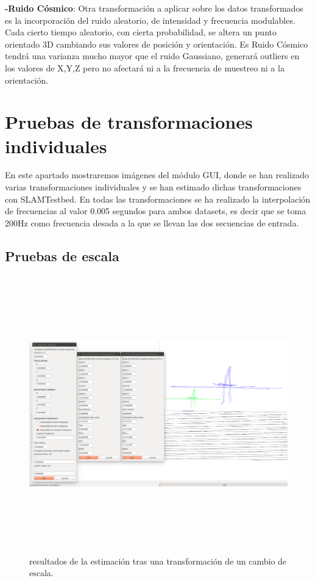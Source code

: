 \textbf{-Ruido Cósmico}: Otra transformación a aplicar sobre los datos transformados es la incorporación del ruido aleatorio, de intensidad y frecuencia modulables. Cada cierto tiempo aleatorio, con cierta probabilidad, se altera un punto orientado 3D cambiando sus valores de posición y orientación. Es Ruido Cósmico tendrá una varianza mucho mayor que el ruido Gaussiano, generará outliers en los valores de X,Y,Z pero no afectará ni a la frecuencia de muestreo ni a la orientación.


\section{Pruebas de transformaciones individuales}

En este apartado mostraremos imágenes del módulo GUI, donde se han realizado varias transformaciones individuales y se han estimado dichas transformaciones con SLAMTestbed.
En todas las transformaciones se ha realizado la interpolación de frecuencias al valor 0.005 segundos para ambos datasets, es decir que se toma 200Hz como frecuencia desada a la que se llevan las dos secuencias de entrada.

\subsection{Pruebas de escala}

\begin{figure}[h]
\label{fig:escalaTest}\includegraphics[height=12.0cm,width=18.0cm]{img/cap6/Escala_abba.png}
\hspace{0.5cm}


\caption{resultados de la estimación tras una transformación de un cambio de escala.}
\end{figure}

